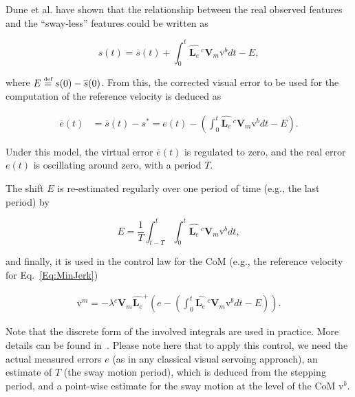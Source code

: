 
Dune et al. have shown that the relationship between the real observed features and the ``sway-less'' features could be written as

\begin{equation}
s(t) = \overline{s}(t) + \int_{0}^{t} {{\widehat{\mathbf L_e}}} \, ^c \mathbf V_{m} \text{v}^b dt - E,
\end{equation}

where $E \stackrel{\mbox{\tiny def}}{=} s(0)-\overline{s}(0)$. From this, the corrected visual error to be used for the computation of the reference velocity is deduced as

\begin{align}
\overline{e}(t)&=\overline{s}(t) -s^*= e(t) -  (\int_{0}^{t}{ {\widehat{\mathbf L_e}}} \, ^c \mathbf V_m \text{v}^b dt -E).
\end{align}

Under this model, the virtual error $\overline{e}(t)$ is regulated to zero, and the real error $e(t)$ is oscillating around zero, with a period $T$. 

The shift $E$ is re-estimated regularly over one period of time (e.g., the last period) by 

$$
E= \frac{1}{T}\int_{t-T}^t\int_0^t { {\widehat{\mathbf L_e}}} \, ^c \mathbf V_m \text{v}^b  dt,
$$ 

and finally, it is used in the control law for the CoM (e.g., the reference velocity for Eq.~\ref{Eq:MinJerk}) 

\begin{gather} 
\overline{\text{v}}^m= -\lambda{ ^c \mathbf V_m {{ {\widehat{\mathbf L_e}}}}^{+}}(e -  (\int_{0}^{t}{{ {\widehat{\mathbf L_e}}}} \, ^c \mathbf V_{m}\text{v}^b dt - E)).
\label{eq:avControlCom2} 
\end{gather} 

Note that the discrete form of the involved integrals are used in practice. More details can be found in~\citep{DuneIROS2010}. Please note here that to apply this control, we need the actual measured errors $e$ (as in any classical visual servoing approach), an estimate of $T$ (the sway motion period), which is deduced from the stepping period, and a point-wise estimate for the sway motion at the level of the CoM $\text{v}^b$.  






